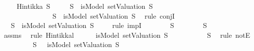 \begin{isabellebody}
\endisatagproof
{\isafoldproof}%
%
\isadelimproof
\isanewline
%
\endisadelimproof
\isanewline
{}\isamarkupfalse%
\ \isanewline
\ \ \ {\isachardoublequoteopen}Hintikka\ S{\isachardoublequoteclose}\isanewline
\ \ \ {\isachardoublequoteopen}{\isacharparenleft}{\isasymbottom}\ {\isasymin}\ S\ {\isasymlongrightarrow}\ isModel\ {\isacharparenleft}setValuation\ S{\isacharparenright}\ {\isasymbottom}{\isacharparenright}\isanewline
\ \ \ \ \ \ \ \ \ \ \ {\isasymand}\ {\isacharparenleft}\isactrlbold {\isasymnot}\ {\isasymbottom}\ {\isasymin}\ S\ {\isasymlongrightarrow}\ {\isacharparenleft}{\isasymnot}{\isacharparenleft}isModel\ {\isacharparenleft}setValuation\ S{\isacharparenright}\ {\isasymbottom}{\isacharparenright}{\isacharparenright}{\isacharparenright}{\isachardoublequoteclose}\isanewline
%
\isadelimproof
%
\endisadelimproof
%
\isatagproof
{}\isamarkupfalse%
\ {\isacharparenleft}rule\ conjI{\isacharparenright}\isanewline
\ \ \isamarkupfalse%
\ {\isachardoublequoteopen}{\isasymbottom}\ {\isasymin}\ S\ {\isasymlongrightarrow}\ isModel\ {\isacharparenleft}setValuation\ S{\isacharparenright}\ {\isasymbottom}{\isachardoublequoteclose}\isanewline
\ \ \isamarkupfalse%
\ {\isacharparenleft}rule\ impI{\isacharparenright}\isanewline
\ \ \ \ \isamarkupfalse%
\ {\isachardoublequoteopen}{\isasymbottom}\ {\isasymin}\ S{\isachardoublequoteclose}\isanewline
\ \ \ \ \isamarkupfalse%
\ {\isachardoublequoteopen}{\isasymbottom}\ {\isasymnotin}\ S{\isachardoublequoteclose}\ \isanewline
\ \ \ \ \ \ \isamarkupfalse%
\ assms\ \isamarkupfalse%
\ {\isacharparenleft}rule\ Hintikka{\isacharunderscore}l{}{\isacharparenright}\isanewline
\ \ \ \ \isamarkupfalse%
\ {\isachardoublequoteopen}isModel\ {\isacharparenleft}setValuation\ S{\isacharparenright}\ {\isasymbottom}{\isachardoublequoteclose}\isanewline
\ \ \ \ \ \ \isamarkupfalse%
\ {\isacartoucheopen}{\isasymbottom}\ {\isasymin}\ S{\isacartoucheclose}\ \isamarkupfalse%
\ {\isacharparenleft}rule\ notE{\isacharparenright}\isanewline
\ \ \isamarkupfalse%
\isanewline
{}\isamarkupfalse%
\isanewline
\ \ \isamarkupfalse%
\ {\isachardoublequoteopen}\isactrlbold {\isasymnot}\ {\isasymbottom}\ {\isasymin}\ S\ {\isasymlongrightarrow}\ {\isasymnot}\ isModel\ {\isacharparenleft}setValuation\ S{\isacharparenright}\ {\isasymbottom}{\isachardoublequoteclose}\isanewline
\ \ \isamarkupfalse%

\end{isabellebody}
